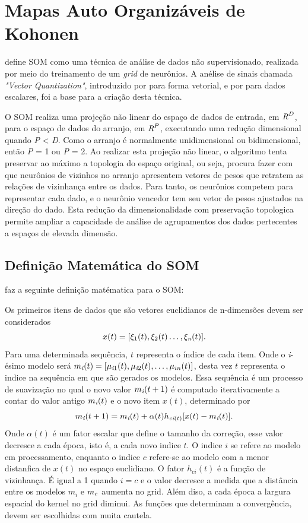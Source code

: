 \documentclass[
	12pt,				%
	openright,			%
	twoside,			%
	a4paper,			%
	english,			%
	french,				%
	spanish,			%
	brazil				%
	]{abntex2}
\begin{document}
\section{Mapas Auto Organizáveis de Kohonen}
 define SOM como uma técnica de análise de dados não supervisionado, realizada por meio do treinamento de um \emph{grid} de neurônios. A anélise de sinais chamada \emph{"Vector Quantization"}, introduzido por  para forma vetorial, e por  para dados escalares, foi a base para a criação desta técnica. 

O SOM realiza uma projeção não linear do espaço de dados de entrada, em $\emph{R}^D$, para o espaço de dados do arranjo, em $\emph{R}^P$, executando uma redução dimensional quando \emph{P} < \emph{D}. Como o arranjo é normalmente unidimensional ou bidimensional, então \emph{P} = 1 ou \emph{P} = 2. Ao realizar esta projeção não linear, o algoritmo tenta preservar ao máximo a topologia do espaço original, ou seja, procura fazer com que neurônios de vizinhos no arranjo apresentem vetores de pesos que retratem as relações de vizinhança entre os dados. Para tanto, os neurônios competem para representar cada dado, e o neurônio vencedor tem seu vetor de pesos ajustados na direção do dado. Esta redução da dimensionalidade com preservação topologica permite ampliar a capacidade de análise de agrupamentos dos dados pertecentes a espaços de elevada dimensão.\cite[p.37]{zuchini2003aplicaccoes}

\subsection{Definição Matemática do SOM}

 faz a seguinte definição matématica para o SOM:

Os primeiros itens de dados que são vetores euclidianos de n-dimensões devem ser considerados 
$$x(t) = [\xi_1(t),\xi_2(t)\ldots, \xi_\emph{n}(t)]. $$
Para uma determinada sequência, $t$ representa o índice de cada item. Onde o \emph{i}-ésimo modelo será $m_\emph{i}(t) = [\mu_{\emph{i}1}(t),\mu_{\emph{i}2}(t),\ldots,\mu_{in}(t)]$, desta vez $t$ representa o indice na sequência em que são gerados os modelos. Essa sequência é um processo de suavização no qual o novo valor $m_\emph{i}(t + 1)$ é computado iterativamente a contar do valor antigo $m_\emph{i}(t)$ e o novo item $x(t)$, determinado por $$m_\emph{i}(t + 1) = m_\emph{i}(t) + \alpha(t)h_{\emph{ci}(t)}[x(t) - m_\emph{i}(t)].$$
Onde $\alpha(t)$ é um fator escalar que define o tamanho da correção, esse valor decresce a cada época, isto é, a cada novo indice $t$. O indice $i$ se refere ao modelo em processamento, enquanto o indice $c$ refere-se ao modelo com a menor distanfica de $x(t)$ no espaço euclidiano. O fator $h_{ci}(t)$ é a função de vizinhança. É igual a 1 quando $i = c$ e o valor decresce a medida que a distância entre os modelos $m_i$ e $m_\emph{c}$ aumenta no grid. Além diso, a cada época a largura espacial do kernel no grid diminui. As funções que determinam a convergência, devem ser escolhidas com muita cautela.
\end{document}
